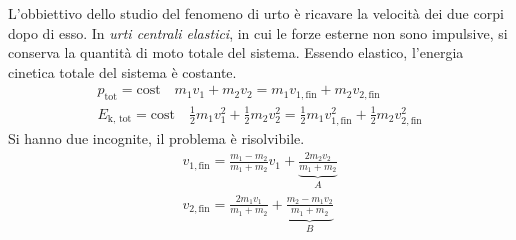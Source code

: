 \documentclass[10pt,a4paper]{book}
\begin{document}
L'obbiettivo dello studio del fenomeno di urto è ricavare la velocità dei due corpi dopo di esso. In \textit{urti centrali elastici}, in cui le forze esterne non sono impulsive, si conserva la quantità di moto totale del sistema. Essendo elastico, l'energia cinetica totale del sistema è costante.
\begin{gather*}
	p_\text{tot}=\text{cost} \quad m_1 v_1+m_2 v_2=m_1 v_{1,\text{fin}}+m_2 v_{2,\text{fin}} \\
	E_\text{k, tot}=\text{cost} \quad \frac{1}{2}m_1 v_1^2+\frac{1}{2}m_2 v_2^2=\frac{1}{2}m_1 v_{1,\text{fin}}^2+\frac{1}{2}m_2 v_{2,\text{fin}}^2
\end{gather*}
Si hanno due incognite, il problema è risolvibile.
\begin{gather*}
	v_{1,\text{fin}}=\frac{m_1-m_2}{m_1+m_2} v_1+\underbrace{\frac{2m_2 v_2}{m_1+m_2}}_A \\
	v_{2,\text{fin}}=\frac{2m_1 v_1}{m_1+m_2}+\underbrace{\frac{m_2-m_1 v_2}{m_1+m_2}}_B
\end{gather*}
\end{document}
